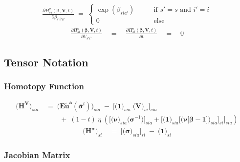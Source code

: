 \documentclass[11pt,fleqn]{article}
\newcommand{\bsigma}{\bm{\sigma}}
\newcommand{\bbeta}{\bm{\beta}}
\newcommand{\bV}{\bm{V}}
\newcommand{\bnu}{\bm{\nu}}
\newcommand{\bone}{\bm{1}}
\newcommand{\tu}{\tilde{u}}
\begin{document}
\begin{align*}
	\frac{ \partial H^\sigma_{si}(\bbeta,\bV,t) }{ \partial \beta_{s'i'a'}} \;=\; 
		\begin{cases}
			\exp(\beta_{sia'}) \qquad&\text{if } s'=s \text{ and } i'=i \\
			0 \qquad&\text{else}  
		\end{cases}
\end{align*}
\begin{align*}
	\frac{ \partial H^\sigma_{si}(\bbeta,\bV,t) }{ \partial V_{s'i'} } \quad=\quad \frac{ \partial H^\sigma_{si}(\bbeta,\bV,t) }{ \partial t } \quad=\quad 0
\end{align*}




\subsection*{Tensor Notation}


\subsubsection*{Homotopy Function}

\begin{align*}
	\biggl( \bm{H^{V}} \biggr)_{sia} & \;=\; 
		\biggl( \bm{{E\tu^{a}}}(\bar{\bsigma}^t) \biggr)_{sia} \;-\; \Biggl[ \biggl( \bone \biggr)_{sia} \; \biggl( \bV \biggr)_{si} \Biggr]_{sia} \\
		& \qquad \;+\; (1-t) \: \eta \; \left( \Biggl[ \biggl( \bnu \biggr)_{sia} \biggl( \bsigma^{-1} \biggr) \Biggr]_{sia} + \Biggl[ \biggl( \bone \biggr)_{sia} \Biggl[ \biggl( \bnu\bigl[\bbeta-\bone\bigr] \biggr)_{sia} \Biggr]_{si} \Biggr]_{sia} \right)
\end{align*}
\begin{align*}
	\biggl( \bm{H^{\sigma}} \biggr)_{si} & \;=\; 
		\Biggl[ \biggl( \bsigma \biggr)_{sia} \Biggr]_{si} \;-\; \biggl( \bone \biggr)_{si} 
\end{align*}


\subsubsection*{Jacobian Matrix} 
\end{document}
